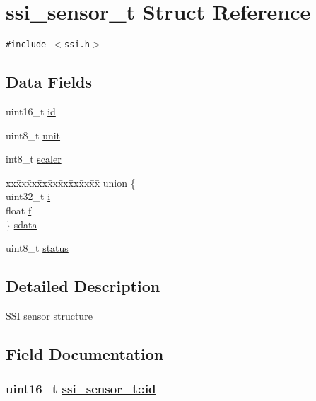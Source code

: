 \hypertarget{structssi__sensor__t}{
\section{ssi\_\-sensor\_\-t Struct Reference}
\label{structssi__sensor__t}
}
{\tt \#include $<$ssi.h$>$}

\subsection*{Data Fields}
\begin{CompactItemize}
\item 
uint16\_\-t \hyperlink{structssi__sensor__t_8b3e3e3f864d8e04c9b666a08ba20261}{id}
\item 
uint8\_\-t \hyperlink{structssi__sensor__t_a1f1ccefe0efae173472155afc32a384}{unit}
\item 
int8\_\-t \hyperlink{structssi__sensor__t_6bbdc857baffd97f4832a621c5b15343}{scaler}
\item 
\begin{tabbing}
xx\=xx\=xx\=xx\=xx\=xx\=xx\=xx\=xx\=\kill
union \{\\
\>uint32\_t \hyperlink{structssi__sensor__t_a775f2114a8d9f1dea8a0cf9e1ce37b1}{i}\\
\>float \hyperlink{structssi__sensor__t_cb3e2bf1d106593a0f2dd9c35c0cf0fa}{f}\\
\} \hyperlink{structssi__sensor__t_95657ef081129f8845132b27b88753b7}{sdata}\\

\end{tabbing}\item 
uint8\_\-t \hyperlink{structssi__sensor__t_3bd3afd85de5f062280f40b14a565328}{status}
\end{CompactItemize}


\subsection{Detailed Description}
SSI sensor structure 



\subsection{Field Documentation}
\hypertarget{structssi__sensor__t_8b3e3e3f864d8e04c9b666a08ba20261}{
\subsubsection[id]{\setlength{\rightskip}{0pt plus 5cm}uint16\_\-t \hyperlink{structssi__sensor__t_8b3e3e3f864d8e04c9b666a08ba20261}{ssi\_\-sensor\_\-t::id}}}
\label{structssi__sensor__t_8b3e3e3f864d8e04c9b666a08ba20261}


